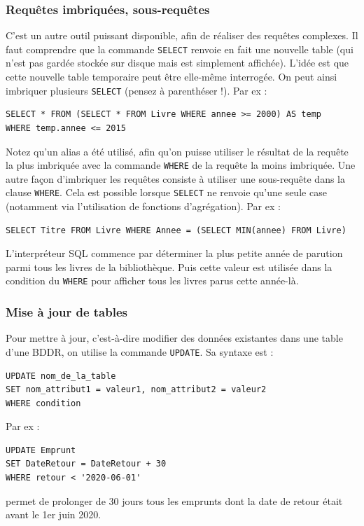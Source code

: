 \documentclass[french,11pt,twoside]{VcCours}
\begin{document}
\subsubsection*{Requêtes imbriquées, sous-requêtes}

C'est un autre outil puissant disponible, afin de réaliser des requêtes complexes. Il faut comprendre que la commande \verb'SELECT' renvoie en fait une nouvelle table (qui n'est pas gardée stockée sur disque mais est simplement affichée). L'idée est que cette nouvelle table temporaire peut être elle-même interrogée. On peut ainsi imbriquer plusieurs \verb'SELECT' (pensez à parenthéser !). Par ex :
\begin{verbatim}
SELECT * FROM (SELECT * FROM Livre WHERE annee >= 2000) AS temp
WHERE temp.annee <= 2015
\end{verbatim}
Notez qu'un alias a été utilisé, afin qu'on puisse utiliser le résultat de la requête la plus imbriquée avec la commande \verb'WHERE' de la requête la moins imbriquée. Une autre façon d'imbriquer les requêtes consiste à utiliser une sous-requête dans la clause \verb'WHERE'. Cela est possible lorsque \verb'SELECT' ne renvoie qu'une seule case (notamment via l'utilisation de fonctions d'agrégation). Par ex : 
\begin{verbatim}
SELECT Titre FROM Livre WHERE Annee = (SELECT MIN(annee) FROM Livre)
\end{verbatim}
L'interpréteur SQL commence par déterminer la plus petite année de parution parmi tous les livres de la bibliothèque. Puis cette valeur est utilisée dans la condition du \verb'WHERE' pour afficher tous les livres parus cette année-là.


\subsubsection*{Mise à jour de tables}

Pour mettre à jour, c'est-à-dire modifier des données existantes dans une table d'une BDDR, on utilise la commande \verb'UPDATE'. Sa syntaxe est :
\begin{verbatim}
UPDATE nom_de_la_table 
SET nom_attribut1 = valeur1, nom_attribut2 = valeur2 
WHERE condition
\end{verbatim}
Par ex :
\begin{verbatim}
UPDATE Emprunt 
SET DateRetour = DateRetour + 30
WHERE retour < '2020-06-01'
\end{verbatim}
permet de prolonger de 30 jours tous les emprunts dont la date de retour était avant le 1er juin 2020.
\end{document}
